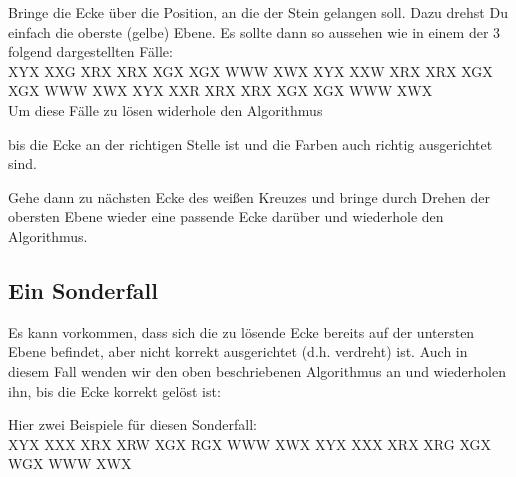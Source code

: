 Bringe die Ecke über die Position, an die der Stein gelangen soll. Dazu drehst
Du einfach die oberste (gelbe) Ebene. Es sollte dann so aussehen wie in einem der 3
folgend dargestellten Fälle: \\[1em]

\RubikCubeGreyAll%
            {X}{Y}{X}
            {X}{X}{G}%
               {X}{R}{X}
	       {X}{R}{X}%
	       {X}{G}{X}
	       {X}{G}{X}%
	      {W}{W}{W}
	      {X}{W}{X}%
%
\RubikCubeGreyAll%
            {X}{Y}{X}
            {X}{X}{W}%
               {X}{R}{X}
	       {X}{R}{X}%
	       {X}{G}{X}
	       {X}{G}{X}%
	      {W}{W}{W}
	      {X}{W}{X}%
%
\RubikCubeGreyAll%
            {X}{Y}{X}
            {X}{X}{R}%
               {X}{R}{X}
	       {X}{R}{X}%
	       {X}{G}{X}
	       {X}{G}{X}%
	      {W}{W}{W}
	      {X}{W}{X}%
\\[3em]
Um diese Fälle zu lösen widerhole den Algorithmus
\begin{center}
\end{center}
bis die Ecke an der richtigen Stelle ist und die Farben auch richtig
ausgerichtet sind.

Gehe dann zu nächsten Ecke des weißen Kreuzes und bringe durch Drehen der
obersten Ebene wieder eine passende Ecke darüber und wiederhole den Algorithmus.

\subsection{Ein Sonderfall}
Es kann vorkommen, dass sich die zu lösende Ecke bereits auf der untersten Ebene befindet, aber nicht korrekt ausgerichtet (d.h. verdreht) ist.
Auch in diesem Fall wenden wir den oben beschriebenen Algorithmus an und wiederholen ihn, bis die Ecke korrekt gelöst ist:
\begin{center}
\end{center}
Hier zwei Beispiele für diesen Sonderfall:\\[1em]
\RubikCubeGreyAll%
            {X}{Y}{X}
            {X}{X}{X}%
               {X}{R}{X}
	       {X}{R}{W}%
	       {X}{G}{X}
	       {R}{G}{X}%
	      {W}{W}{W}
	      {X}{W}{X}%
%
\RubikCubeGreyAll%
            {X}{Y}{X}
            {X}{X}{X}%
               {X}{R}{X}
	       {X}{R}{G}%
	       {X}{G}{X}
	       {W}{G}{X}%
	      {W}{W}{W}
	      {X}{W}{X}%


